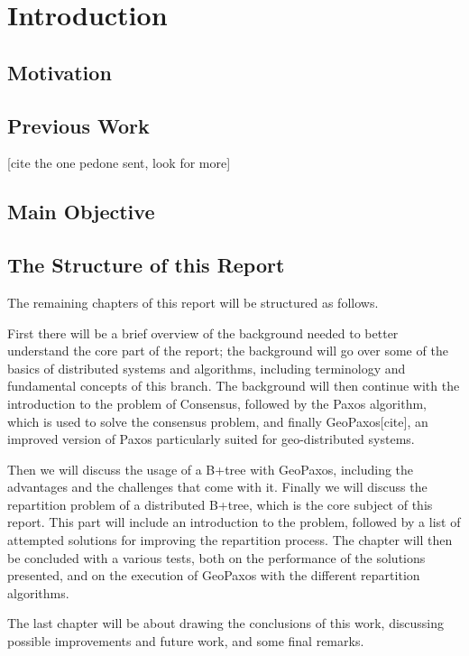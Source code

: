 \chapter{Introduction}\label{sec:introduction}


\section{Motivation}\label{sec:motivation}


\section{Previous Work}\label{sec:previous-work}
[cite the one pedone sent, look for more]

\section{Main Objective}\label{sec:main-objective}


\section{The Structure of this Report}\label{the-structure-of-this-report}
The remaining chapters of this report will be structured as follows.

First there will be a brief overview of the background needed to better understand the core part of the report; the background will go over some of the basics of distributed systems and algorithms, including terminology and fundamental concepts of this branch. The background will then continue with the introduction to the problem of Consensus, followed by the Paxos algorithm, which is used to solve the consensus problem, and finally GeoPaxos[cite], an improved version of Paxos particularly suited for geo-distributed systems. 

Then we will discuss the usage of a B+tree with GeoPaxos, including the advantages and the challenges that come with it. Finally we will discuss the repartition problem of a distributed B+tree, which is the core subject of this report. This part will include an introduction to the problem, followed by a list of attempted solutions for improving the repartition process. The chapter will then be concluded with a various tests, both on the performance of the solutions presented, and on the execution of GeoPaxos with the different repartition algorithms.

The last chapter will be about drawing the conclusions of this work, discussing possible improvements and future work, and some final remarks.